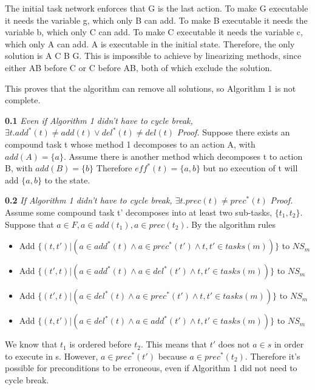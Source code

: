 	The initial task network enforces that G is the last action.
	To make G executable it needs the variable g, which only B can add.
	To make B executable it needs the variable b, which only C can add.
	To make C executable it needs the variable c, which only A can add.
	A is executable in the initial state.
	Therefore, the only solution is A C B G. This is impossible to achieve by linearizing methods, since either AB before C or C before AB, both of which exclude the solution. 
	
	This proves that the algorithm can remove all solutions, so Algorithm 1 is not complete.
	

\textbf{0.1} \textit{Even if Algorithm 1 didn't have to cycle break, $\exists t. add^{*}(t) \neq add(t) \lor del^{*}(t) \neq del(t) $ }\newline
\textit{Proof.}
Suppose there exists an compound task t whose method 1 decomposes to an action A, with $add(A) = \{a\}$.
Assume there is another method which decomposes t to action B, with $add(B) = \{b\}$
Therefore $eff^{*}(t) =\{a, b\} $ but no execution of t will add $\{a, b\}$ to the state.


\textbf{0.2} \textit{If Algorithm 1 didn't have to cycle break, $\exists t. prec(t) \neq prec^{*}(t)$} \newline
\textit{Proof.}
Assume some compound task t' decomposes into at least two sub-tasks, $\{t_1, t_2\}$. Suppose that $a \in F, a \in add(t_1), a \in prec(t_2)$. By the algorithm rules
\begin{itemize}			
	\item Add $\{ (t, t') |  (a \in add^{*}(t) \land a \in prec^{*}(t') \land t, t' \in tasks(m) ) \}$ to $NS_m$ 
	\item Add $\{ (t', t) |  (a \in add^{*}(t) \land a \in del^{*}(t') \land t, t' \in tasks(m) ) \}$ to $NS_m$ 
	\item Add $\{ (t', t) |  (a \in del^{*}(t) \land a \in prec^{*}(t') \land t, t' \in tasks(m) ) \}$ to $NS_m$ 
	\item Add $\{ (t, t') |  (a \in del^{*}(t) \land a \in add^{*}(t') \land t, t' \in tasks(m) ) \}$ to $NS_m$ 
\end{itemize}	
We know that $t_1$ is ordered before $t_2$. This means that $t'$ does not $a \in s$ in order to execute in s. However, $a \in prec^{*}(t')$ because $a \in prec^{*}(t_2)$. 
Therefore it's possible for preconditions to be erroneous, even if Algorithm 1 did not need to cycle break.




